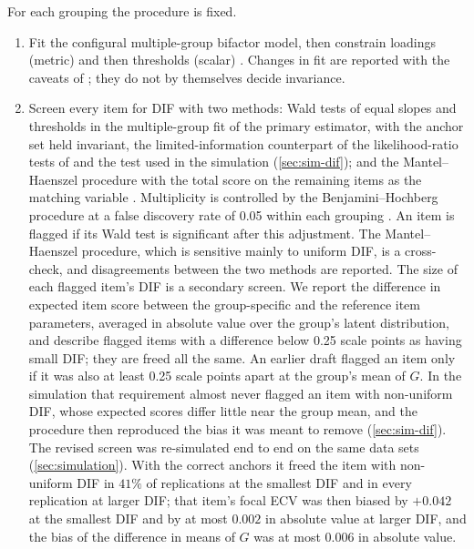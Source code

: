 For each grouping the procedure is fixed.
\begin{enumerate}[1.]
  \item Fit the configural multiple-group bifactor model, then constrain loadings (metric) and then thresholds (scalar) \citep{meredith1993,millsap2011}. Changes in fit are reported with the caveats of \citet{chen2007}; they do not by themselves decide invariance.
  \item Screen every item for DIF with two methods: Wald tests of equal slopes and thresholds in the multiple-group fit of the primary estimator, with the anchor set held invariant, the limited-information counterpart of the likelihood-ratio tests of \citet{thissen1993} and the test used in the simulation (\cref{sec:sim-dif}); and the Mantel--Haenszel procedure with the total score on the remaining items as the matching variable \citep{holland1988}. Multiplicity is controlled by the Benjamini--Hochberg procedure at a false discovery rate of 0.05 within each grouping \citep{benjamini1995}. An item is flagged if its Wald test is significant after this adjustment. The Mantel--Haenszel procedure, which is sensitive mainly to uniform DIF, is a cross-check, and disagreements between the two methods are reported. The size of each flagged item's DIF is a secondary screen. We report the difference in expected item score between the group-specific and the reference item parameters, averaged in absolute value over the group's latent distribution, and describe flagged items with a difference below 0.25 scale points as having small DIF; they are freed all the same. An earlier draft flagged an item only if it was also at least 0.25 scale points apart at the group's mean of $G$. In the simulation that requirement almost never flagged an item with non-uniform DIF, whose expected scores differ little near the group mean, and the procedure then reproduced the bias it was meant to remove (\cref{sec:sim-dif}). The revised screen was re-simulated end to end on the same data sets (\cref{sec:simulation}). With the correct anchors it freed the item with non-uniform DIF in $41\%$ of replications at the smallest DIF and in every replication at larger DIF; that item's focal ECV was then biased by $+0.042$ at the smallest DIF and by at most $0.002$ in absolute value at larger DIF, and the bias of the difference in means of $G$ was at most $0.006$ in absolute value.

\end{enumerate}
